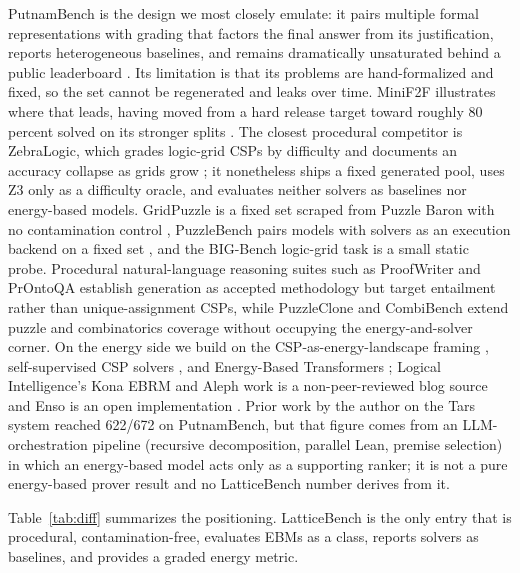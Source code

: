 \documentclass[11pt]{article}
\begin{document}
PutnamBench is the design we most closely emulate: it pairs multiple formal
representations with grading that factors the final answer from its justification,
reports heterogeneous baselines, and remains dramatically unsaturated behind a
public leaderboard \citep{putnambench}. Its limitation is that its problems are
hand-formalized and fixed, so the set cannot be regenerated and leaks over time.
MiniF2F illustrates where that leads, having moved from a hard release target
toward roughly 80 percent solved on its stronger splits \citep{minif2f}. The
closest procedural competitor is ZebraLogic, which grades logic-grid CSPs by
difficulty and documents an accuracy collapse as grids grow \citep{zebralogic};
it nonetheless ships a fixed generated pool, uses Z3 only as a difficulty oracle,
and evaluates neither solvers as baselines nor energy-based models. GridPuzzle is
a fixed set scraped from Puzzle Baron with no contamination control
\citep{gridpuzzle}, PuzzleBench pairs models with solvers as an execution backend
on a fixed set \citep{puzzlebench}, and the BIG-Bench logic-grid task is a small
static probe. Procedural natural-language reasoning suites such as ProofWriter
\citep{proofwriter} and PrOntoQA \citep{prontoqa} establish generation as accepted
methodology but target entailment rather than unique-assignment CSPs, while
PuzzleClone \citep{puzzleclone} and CombiBench \citep{combibench} extend puzzle and
combinatorics coverage without occupying the energy-and-solver corner. On the
energy side we build on the CSP-as-energy-landscape framing \citep{cspenergy},
self-supervised CSP solvers \citep{ssvcsp}, and Energy-Based Transformers
\citep{ebt}; Logical Intelligence's Kona EBRM and Aleph work is a non-peer-reviewed
blog source \citep{kona} and Enso is an open implementation \citep{enso}. Prior
work by the author on the Tars system reached 622/672 on PutnamBench, but that
figure comes from an LLM-orchestration pipeline (recursive decomposition, parallel
Lean, premise selection) in which an energy-based model acts only as a supporting
ranker; it is not a pure energy-based prover result and no LatticeBench number
derives from it.

Table~\ref{tab:diff} summarizes the positioning. LatticeBench is the only entry
that is procedural, contamination-free, evaluates EBMs as a class, reports solvers
as baselines, and provides a graded energy metric.
\end{document}
